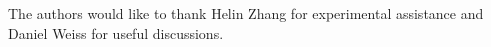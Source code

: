 \begin{acknowledgments}
  The authors would like to thank Helin Zhang for experimental assistance
  and Daniel Weiss for useful discussions.
\end{acknowledgments}
